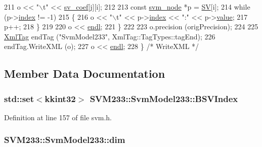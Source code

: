 \begin{DoxyCode}
211       o << \textcolor{stringliteral}{"\(\backslash\)t"} << \hyperlink{struct_s_v_m233_1_1_svm_model233_ac60e898fcd1028cc699269ef5995df06}{sv\_coef}[j][i];
212 
213     \textcolor{keyword}{const} \hyperlink{struct_s_v_m233_1_1svm__node}{svm\_node} *p = \hyperlink{struct_s_v_m233_1_1_svm_model233_a97dd1118f0bf7803ad6f4d952a56d06b}{SV}[i];
214     \textcolor{keywordflow}{while}  (p->\hyperlink{struct_s_v_m233_1_1svm__node_a3c4e097d4f2ba8091128a9b605fcaa12}{index} != -1)
215     \{
216       o << \textcolor{stringliteral}{"\(\backslash\)t"} << p->\hyperlink{struct_s_v_m233_1_1svm__node_a3c4e097d4f2ba8091128a9b605fcaa12}{index} << \textcolor{stringliteral}{":"} << p->\hyperlink{struct_s_v_m233_1_1svm__node_abc3f1df2ce88e0759c7f3fe74eefcf0d}{value};
217       p++;
218     \}
219 
220     o << \hyperlink{namespace_k_k_b_ad1f50f65af6adc8fa9e6f62d007818a8}{endl};
221   \}
222 
223    o.precision (origPrecision);
224 
225   \hyperlink{class_k_k_b_1_1_xml_tag}{XmlTag}  endTag (\textcolor{stringliteral}{"SvmModel233"}, XmlTag::TagTypes::tagEnd);
226   endTag.WriteXML (o);
227   o << \hyperlink{namespace_k_k_b_ad1f50f65af6adc8fa9e6f62d007818a8}{endl};
228 \}  \textcolor{comment}{/* WriteXML */}
\end{DoxyCode}


\subsection{Member Data Documentation}
\subsubsection[{\texorpdfstring{B\+S\+V\+Index}{BSVIndex}}]{\setlength{\rightskip}{0pt plus 5cm}std\+::set$<${\bf kkint32}$>$ S\+V\+M233\+::\+Svm\+Model233\+::\+B\+S\+V\+Index}\hypertarget{struct_s_v_m233_1_1_svm_model233_a372161aff471166f8f683ae7a948ce58}{}\label{struct_s_v_m233_1_1_svm_model233_a372161aff471166f8f683ae7a948ce58}


Definition at line 157 of file svm.\+h.

\subsubsection[{\texorpdfstring{dim}{dim}}]{ S\+V\+M233\+::\+Svm\+Model233\+::dim}\hypertarget{struct_s_v_m233_1_1_svm_model233_ad0681f24a20ff15423eb9b3b0d24c1c6}{}\label{struct_s_v_m233_1_1_svm_model233_ad0681f24a20ff15423eb9b3b0d24c1c6}


